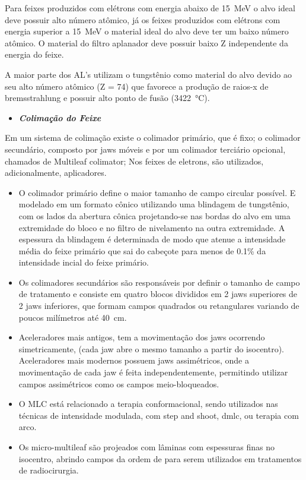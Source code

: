 \documentclass[11pt,a4paper]{article}
\begin{document}
    Para feixes produzidos com elétrons com energia abaixo de \qty{15}{MeV} o alvo ideal deve possuir alto número atômico, já os feixes produzidos com elétrons com energia superior a \qty{15}{MeV} o material ideal do alvo deve ter um baixo número atômico. O material do filtro aplanador deve possuir baixo Z independente da energia do feixe.

    A maior parte dos AL's utilizam o tungstênio como material do alvo devido ao seu alto número atômico (Z = 74) que favorece a produção de raios-x de bremsstrahlung e possuir alto ponto de fusão (\qty{3422}{\degreeCelsius}).


                \begin{itemize}
                    \item \textbf{\textit{\textcolor{CarnationPink}{Colimação do Feixe}}}
                \end{itemize}

    Em um sistema de colimação existe o colimador primário, que é fixo; o colimador secundário, composto por jaws móveis e por um colimador terciário opcional, chamados de Multileaf colimator; Nos feixes de eletrons, são utilizados, adicionalmente, aplicadores.

    \begin{itemize}
		\item O colimador primário define o maior tamanho de campo circular possível. E modelado em um formato cônico utilizando uma blindagem de tungstênio, com os lados da abertura cônica projetando-se nas bordas do alvo em uma extremidade do bloco e no filtro de nivelamento na outra extremidade. A espessura da blindagem é determinada de modo que atenue a intensidade média do feixe primário que sai do cabeçote para menos de 0.1\% da intensidade incial do feixe primário.
		
		\item Os colimadores secundários são responsáveis por definir o tamanho de campo de tratamento e consiste em quatro blocos divididos em 2 jaws superiores de 2 jaws inferiores, que formam campos quadrados ou retangulares variando de poucos milímetros até \qty{40}{cm}.
		
		\item Aceleradores mais antigos, tem a movimentação dos jaws ocorrendo simetricamente, (cada jaw abre o mesmo tamanho a partir do isocentro). Aceleradores mais modernos possuem jaws assimétricos, onde a movimentação de cada jaw é feita independentemente, permitindo utilizar campos assimétricos como os campos meio-bloqueados.
		
		\item O MLC está relacionado a terapia conformacional, sendo utilizados nas técnicas de intensidade modulada, com step and shoot, dmlc, ou terapia com arco.
		
		\item Os micro-multileaf são projeados com lâminas com espessuras finas no isocentro, abrindo campos da ordem de  para serem utilizados em tratamentos de radiocirurgia.
	\end{itemize}
\end{document}
